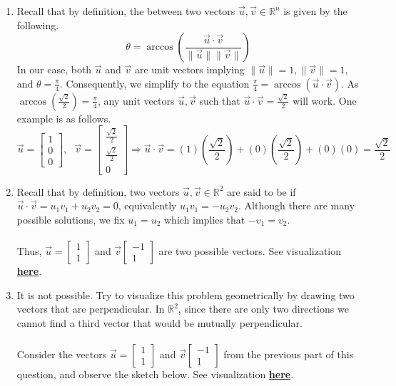 \begin{SaveQuestion}
\begin{enumerate}
    \item Recall that by definition, the  between two vectors $\vec u, \vec v \in \mathbb{R}^n$ is given by the following.
    $$\theta = \arccos\left(\frac{\vec u \cdot \vec v}{\|\vec u\|\|\vec v\|}\right)$$
    In our case, both $\vec u$ and $\vec v$ are unit vectors implying $\|\vec u\| = 1, \|\vec v\| = 1$, and $\theta = \frac{\pi}{4}$. Consequently, we simplify to the equation $\frac{\pi}{4} = \arccos(\vec u \cdot \vec v)$. As $\arccos(\frac{\sqrt{2}}{2}) = \frac{\pi}{4}$, any unit vectors $\vec u, \vec v$ such that $\vec u \cdot \vec v = \frac{\sqrt{2}}{2}$ will work. One example is as follows.
    $$\vec u = \begin{bmatrix} 1 \\ 0 \\ 0 \end{bmatrix}, \ \ \ \vec v = \begin{bmatrix} \frac{\sqrt{2}}{2} \\ \frac{\sqrt{2}}{2} \\ 0 \end{bmatrix} \Longrightarrow \vec u \cdot \vec v = (1)\left(\frac{\sqrt{2}}{2}\right) + (0)\left(\frac{\sqrt{2}}{2}\right) + (0)(0) = \frac{\sqrt{2}}{2}$$
    
    \item Recall that by definition, two vectors $\vec u, \vec v \in \mathbb{R}^2$ are said to be  if $\vec u \cdot \vec v = u_1 v_1 + u_2 v_2 = 0$, equivalently $u_1 v_1 = - u_2 v_2$. Although there are many possible solutions, we fix $u_1 = u_2$ which implies that $-v_1 = v_2$. \\ \\
    Thus, $\vec u = \begin{bmatrix} 1 \\ 1 \end{bmatrix}$ and $\vec v \begin{bmatrix} -1 \\ 1 \end{bmatrix}$ are two possible vectors. See visualization \href{https://www.desmos.com/calculator/pdwupzdiyg}{\textbf{here}}.
    
    \item It is not possible. Try to visualize this problem geometrically by drawing two vectors that are perpendicular. In $\mathbb{R}^2$, since there are only two directions we cannot find a third vector that would be mutually perpendicular.  \\ \\
    Consider the vectors $\vec u = \begin{bmatrix} 1 \\ 1 \end{bmatrix}$ and $\vec v \begin{bmatrix} -1 \\ 1 \end{bmatrix}$ from the previous part of this question, and observe the sketch below. See visualization \href{https://www.desmos.com/calculator/pdwupzdiyg}{\textbf{here}}.


\end{enumerate}
\end{SaveQuestion}
